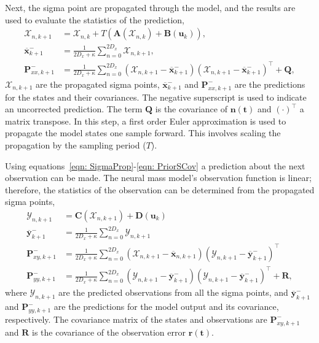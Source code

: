 Next, the sigma point are propagated through the model, and the results are used to evaluate the statistics of the prediction,
\begin{align}\label{eqn: SigmaProp}%
\mathbf{\mathcal{X}}_{n,k+1} &= \mathbf{\mathcal{X}}_{n,k}+ T(\mathbf{A}(\mathbf{\mathcal{X}}_{n,k}) +\mathbf{B}(\mathbf{u}_{k})),\\
\label{eqn: PriorSMean}
\overline{\mathbf{x}}_{k+1}^{-} &= \frac{1}{2D_{x}+\kappa}\sum_{n=0}^{2D_{x}} \mathbf{\mathcal{X}}_{n,k+1},\\
\label{eqn: PriorSCov}
\mathbf{P}_{xx,k+1}^{-} &= \frac{1}{2D_{x}+\kappa}\sum_{n=0}^{2D_{x}} (\mathbf{\mathcal{X}}_{n,k+1} -\mathbf{\overline{x}}_{k+1}^{-})(\mathbf{\mathcal{X}}_{n,k+1}-\mathbf{\overline{x}}_{k+1}^{-})^{\top} + \mathbf{Q},%
\end{align} $\mathbf{\mathcal{X}}_{n,k+1}$ are the propagated sigma points, $\overline{\mathbf{x}}_{k+1}^{-}$ and $\mathbf{P}_{xx,k+1}^{-}$ are the predictions for the states and their covariances. The negative superscript is used to indicate an uncorrected prediction. The term $\mathbf{Q}$ is the covariance of $\mathbf{n(t)}$ and $(\cdot)^{\top}$ a matrix transpose. In this step, a first order Euler approximation is used to propagate the model states one sample forward. This involves scaling the propagation by the sampling period ($T$).

Using equations~\ref{eqn: SigmaProp}-\ref{eqn: PriorSCov} a prediction about the next observation can be made. The neural mass model's observation function is linear; therefore, the statistics of the observation can be determined from the propagated sigma points,
\begin{align}
\mathbf{\mathcal{Y}}_{n,k+1} &= \mathbf{C}(\mathbf{\mathcal{X}}_{n,k+1})+ \mathbf{D}(\mathbf{u}_{k})\\
\overline{\mathbf{y}}_{k+1}^{-} &= \frac{1}{2D_{x}+\kappa}\sum_{n=0}^{2D_{x}} \mathbf{\mathcal{Y}}_{n,k+1}\\
\label{eqn: statecovg}
\mathbf{P}_{xy,k+1}^{-} &= \frac{1}{2D_{x}+\kappa}\sum_{n=0}^{2D_{x}} (\mathbf{\mathcal{X}}_{n,k+1}-\overline{\mathbf{x}}_{n,k+1}) (\mathbf{\mathcal{Y}}_{n,k+1}-\overline{\mathbf{y}}_{k+1}^{-})^{\top}\\
\mathbf{P}_{yy,k+1}^{-} &= \frac{1}{2D_{x}+\kappa}\sum_{n=0}^{2D_{x}} (\mathbf{\mathcal{Y}}_{n,k+1}-\overline{\mathbf{y}}_{k+1}^{-}) (\mathbf{\mathcal{Y}}_{n,k+1}-\overline{\mathbf{y}}_{k+1}^{-})^{\top} +\mathbf{R},%
\end{align} where $\mathbf{\mathcal{Y}}_{n,k+1}$ are the predicted observations from all the sigma points, and $\overline{\mathbf{y}}_{k+1}^{-}$ and $\mathbf{P}_{yy,k+1}^{-}$ are the predictions for the model output and its covariance, respectively. The covariance matrix of the states and observations are $\mathbf{P}_{xy,k+1}^{-}$ and $\mathbf{R}$ is the covariance of the observation error $\mathbf{r(t)}$.

